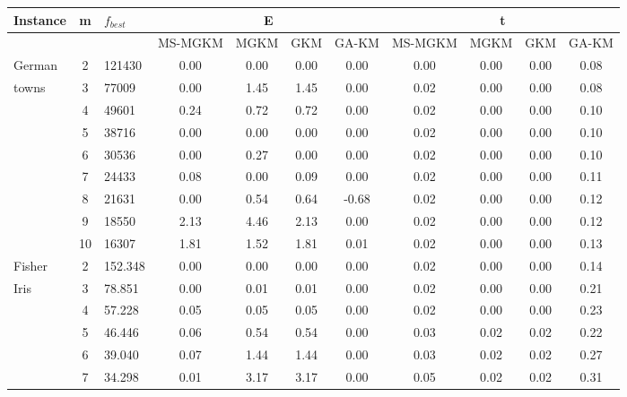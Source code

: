 {\scriptsize
\centering
\begin{longtable}{@{}lclcccccccc@{}}
\toprule
Instance              & m  & $f_{best}$      & \multicolumn{4}{c}{E}           & \multicolumn{4}{c}{t}         \\ \midrule
                      &    &                 & MS-MGKM & MGKM  & GKM   & GA-KM & MS-MGKM & MGKM & GKM  & GA-KM \\
German                & 2  & 121430          & 0.00    & 0.00  & 0.00  & 0.00  & 0.00    & 0.00 & 0.00 & 0.08  \\
towns                 & 3  & 77009           & 0.00    & 1.45  & 1.45  & 0.00  & 0.02    & 0.00 & 0.00 & 0.08  \\
                      & 4  & 49601           & 0.24    & 0.72  & 0.72  & 0.00  & 0.02    & 0.00 & 0.00 & 0.10  \\
                      & 5  & 38716           & 0.00    & 0.00  & 0.00  & 0.00  & 0.02    & 0.00 & 0.00 & 0.10  \\
                      & 6  & 30536           & 0.00    & 0.27  & 0.00  & 0.00  & 0.02    & 0.00 & 0.00 & 0.10  \\
                      & 7  & 24433           & 0.08    & 0.00  & 0.09  & 0.00  & 0.02    & 0.00 & 0.00 & 0.11  \\
                      & 8  & 21631           & 0.00    & 0.54  & 0.64  & -0.68 & 0.02    & 0.00 & 0.00 & 0.12  \\
                      & 9  & 18550           & 2.13    & 4.46  & 2.13  & 0.00  & 0.02    & 0.00 & 0.00 & 0.12  \\
                      & 10 & 16307           & 1.81    & 1.52  & 1.81  & 0.01  & 0.02    & 0.00 & 0.00 & 0.13  \\ \hline
Fisher                & 2  & 152.348         & 0.00    & 0.00  & 0.00  & 0.00  & 0.02    & 0.00 & 0.00 & 0.14  \\
Iris                  & 3  & 78.851          & 0.00    & 0.01  & 0.01  & 0.00  & 0.02    & 0.00 & 0.00 & 0.21  \\
                      & 4  & 57.228          & 0.05    & 0.05  & 0.05  & 0.00  & 0.02    & 0.00 & 0.00 & 0.23  \\
                      & 5  & 46.446          & 0.06    & 0.54  & 0.54  & 0.00  & 0.03    & 0.02 & 0.02 & 0.22  \\
                      & 6  & 39.040          & 0.07    & 1.44  & 1.44  & 0.00  & 0.03    & 0.02 & 0.02 & 0.27  \\
                      & 7  & 34.298          & 0.01    & 3.17  & 3.17  & 0.00  & 0.05    & 0.02 & 0.02 & 0.31  \\

\end{longtable}}
